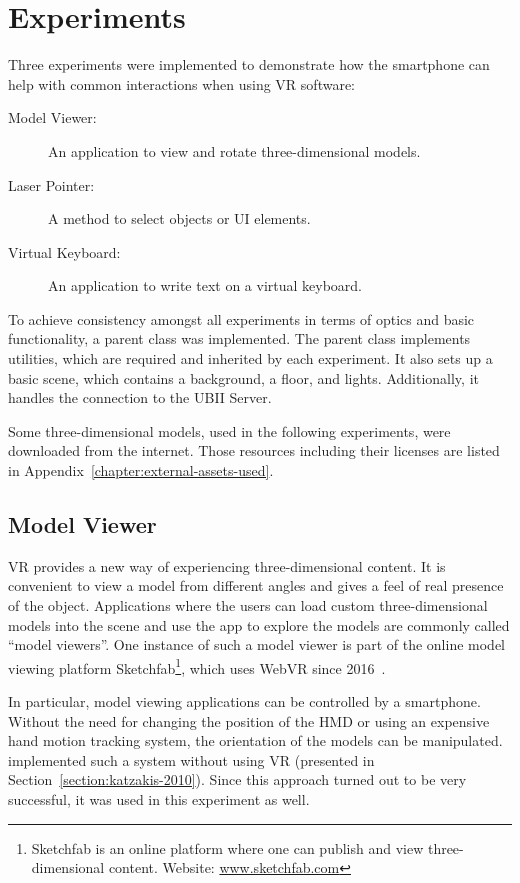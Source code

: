 \chapter{Experiments}\label{chapter:experiments}

Three experiments were implemented to demonstrate how the smartphone can help with common interactions when using \gls{VR} software:

\begin{description}
  \item[Model Viewer:] An application to view and rotate three-dimensional models.
  \item[Laser Pointer:] A method to select objects or \gls{UI} elements.
  \item[Virtual Keyboard:] An application to write text on a virtual keyboard.
\end{description}

To achieve consistency amongst all experiments in terms of optics and basic functionality, a parent class was implemented. The parent class implements utilities, which are required and inherited by each experiment. It also sets up a basic scene, which contains a background, a floor, and lights. Additionally, it handles the connection to the \gls{UBII} Server.

Some three-dimensional models, used in the following experiments, were downloaded from the internet. Those resources including their licenses are listed in Appendix~\ref{chapter:external-assets-used}.


\section{Model Viewer}\label{section:model-viewer}

\acrlong{VR} provides a new way of experiencing three-dimensional content. It is convenient to view a model from different angles and gives a feel of real presence of the object. Applications where the users can load custom three-dimensional models into the scene and use the app to explore the models are commonly called \enquote{model viewers}. One instance of such a model viewer is part of the online model viewing platform Sketchfab\footnote{Sketchfab is an online platform where one can publish and view three-dimensional content. Website: \href{https://sketchfab.com}{www.sketchfab.com}}, which uses Web\gls{VR} since 2016~\cite{Denoyel.2016}. 

In particular, model viewing applications can be controlled by a smartphone. Without the need for changing the position of the \gls{HMD} or using an expensive hand motion tracking system, the orientation of the models can be manipulated.
\citeauthor{Katzakis.2010} implemented such a system without using \gls{VR} (presented in Section~\ref{section:katzakis-2010}). Since this approach turned out to be very successful, it was used in this experiment as well.


